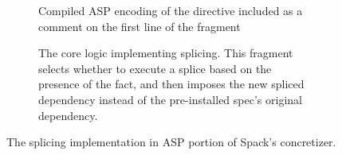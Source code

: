 \begin{figure}
\begin{subfigure}[t]{1.0\columnwidth}

\caption{Compiled ASP encoding of the  directive included
  as a comment on the first line of the fragment}
\label{fig:can-splice-encoding}
\end{subfigure}
\begin{subfigure}[b]{1.0\columnwidth}

\caption{The core logic implementing splicing. This fragment selects whether to
  execute a splice based on the presence of the  fact, and then
  imposes the new spliced dependency instead of the pre-installed spec's original
  dependency.} 
  \label{fig:splice-lp}
\end{subfigure}
\caption{The splicing implementation in ASP portion of Spack's concretizer.}
\label{fig:splice-concretizer}
\end{figure}


